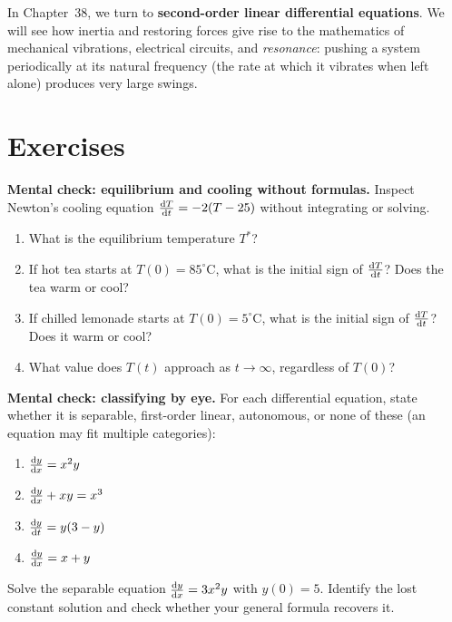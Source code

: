 In Chapter~38, we turn to \textbf{second-order linear differential
equations}. We will see how inertia and restoring forces give rise to the
mathematics of mechanical vibrations, electrical circuits, and \emph{resonance}:
pushing a system periodically at its natural frequency (the rate at which it
vibrates when left alone) produces very large swings.

\section{Exercises}

\begin{exercise}
\textbf{Mental check: equilibrium and cooling without formulas.}
Inspect Newton's cooling equation $\frac{\mathrm{d} T}{\mathrm{d} t} = -2(T - 25)$ without integrating or solving.
\begin{enumerate}[label=(\alph*)]
\item What is the equilibrium temperature $T^*$?
\item If hot tea starts at $T(0) = 85^\circ$C, what is the initial sign of $\frac{\mathrm{d} T}{\mathrm{d} t}$? Does the tea warm or cool?
\item If chilled lemonade starts at $T(0) = 5^\circ$C, what is the initial sign of $\frac{\mathrm{d} T}{\mathrm{d} t}$? Does it warm or cool?
\item What value does $T(t)$ approach as $t\to\infty$, regardless of $T(0)$?
\end{enumerate}
\end{exercise}

\begin{exercise}
\textbf{Mental check: classifying by eye.}
For each differential equation, state whether it is separable, first-order linear,
autonomous, or none of these (an equation may fit multiple categories):
\begin{enumerate}[label=(\alph*)]
\item $\frac{\mathrm{d} y}{\mathrm{d} x} = x^2 y$
\item $\frac{\mathrm{d} y}{\mathrm{d} x} + x y = x^3$
\item $\frac{\mathrm{d} y}{\mathrm{d} t} = y(3 - y)$
\item $\frac{\mathrm{d} y}{\mathrm{d} x} = x + y$
\end{enumerate}
\end{exercise}

\begin{exercise}
Solve the separable equation $\frac{\mathrm{d} y}{\mathrm{d} x} = 3x^2 y$ with $y(0)=5$. Identify the lost
constant solution and check whether your general formula recovers it.
\end{exercise}

